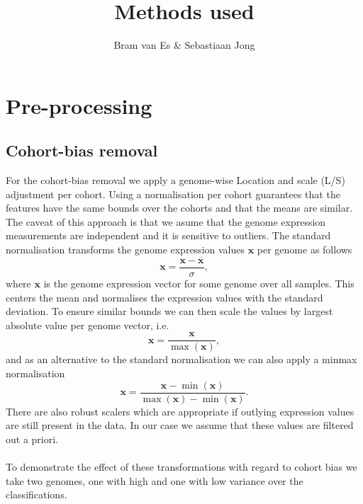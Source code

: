 \documentclass[a4paper,10pt]{article}
\title{Methods used}
\author{Bram van Es \& Sebastiaan Jong}
\begin{document}
\begin{abstract}

\end{abstract}


\section{Pre-processing}

\subsection{Cohort-bias removal}
%
For the cohort-bias removal we apply a genome-wise Location and scale (L/S) adjustment per cohort.
Using a normalisation per cohort guarantees that the features have the same bounds 
over the cohorts and that the means are similar. The caveat of this approach is that we asume 
that the genome expression measurements are independent and it is sensitive to outliers.
%
The standard normalisation transforms the genome expression values $\mathbf{x}$ per genome as follows
\begin{equation}
  \mathbf{x} = \frac{\mathbf{x} - \overline{\mathbf{x}}}{\sigma},
\end{equation}
%
where $\mathbf{x}$ is the genome expression vector for some genome over all samples. 
This centers the mean and normalises the  expression values with the standard deviation. 
To ensure similar bounds we can then scale the values by largest absolute value per genome vector, i.e.
\begin{equation}
  \mathbf{x} = \frac{\mathbf{x}}{\max{(\mathbf{x})}},
\end{equation}
%
and as an alternative to the standard normalisation we can also apply a minmax normalisation
\begin{equation}
 \mathbf{x} = \frac{\mathbf{x} - \min{(\mathbf{x})}}{\max{(\mathbf{x})} - \min{(\mathbf{x})}}.
\end{equation}
%
There are also robust scalers which are appropriate if outlying expression values 
are still present in the data. In our case we assume that these values are filtered out a priori. \\ \\
%
To demonstrate the effect of these transformations with regard to cohort bias we take two genomes, one with high and one with low variance
over the classifications. \\ \\
%
\end{document}
